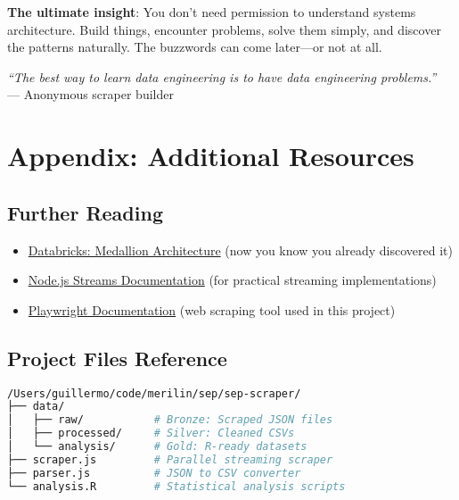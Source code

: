 \documentclass[11pt,a4paper]{article}
\begin{document}
\textbf{The ultimate insight}: You don't need permission to understand systems architecture. Build things, encounter problems, solve them simply, and discover the patterns naturally. The buzzwords can come later—or not at all.

\vspace{1em}

\begin{center}
\textit{``The best way to learn data engineering is to have data engineering problems.''} \\
— Anonymous scraper builder
\end{center}

\section*{Appendix: Additional Resources}

\subsection*{Further Reading}

\begin{itemize}
    \item \href{https://www.databricks.com/glossary/medallion-architecture}{Databricks: Medallion Architecture} (now you know you already discovered it)
    \item \href{https://nodejs.org/api/stream.html}{Node.js Streams Documentation} (for practical streaming implementations)
    \item \href{https://playwright.dev/docs/intro}{Playwright Documentation} (web scraping tool used in this project)
\end{itemize}

\subsection*{Project Files Reference}

\begin{lstlisting}[language=bash]
/Users/guillermo/code/merilin/sep/sep-scraper/
├── data/
│   ├── raw/           # Bronze: Scraped JSON files
│   ├── processed/     # Silver: Cleaned CSVs
│   └── analysis/      # Gold: R-ready datasets
├── scraper.js         # Parallel streaming scraper
├── parser.js          # JSON to CSV converter
└── analysis.R         # Statistical analysis scripts
\end{lstlisting}
\end{document}

